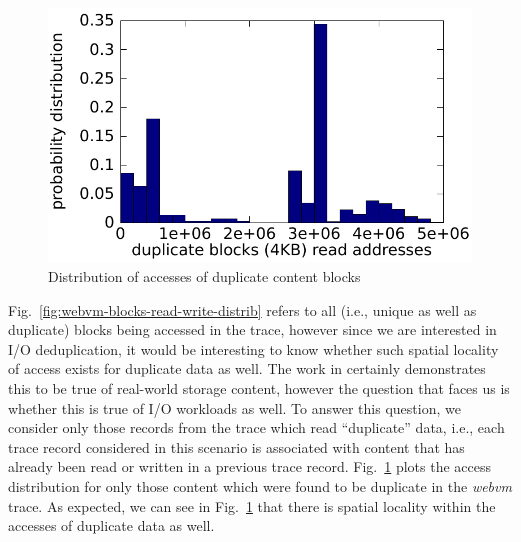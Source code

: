 \begin{figure}
    \centering
    \includegraphics[scale=0.6]{tracechar-figures/21-day/webvm-dedup-block-read-appended-21-prob.pdf}
    \caption{Distribution of accesses of duplicate content blocks}
    \label{fig:webvm-blocks-dedup-distrib}
\end{figure}

Fig.~\ref{fig:webvm-blocks-read-write-distrib} refers to all (i.e., unique as well as
duplicate) blocks
being accessed in the trace, however since we are interested in I/O
deduplication, it would be interesting to know whether such spatial
locality of access exists for duplicate data as well. The work in
\cite{idedup} certainly demonstrates this to be true of real-world storage content,
however the question that faces us is whether this is true of I/O workloads
as well.
To answer this question, we
consider only those records from the trace which read ``duplicate''
data, i.e., each trace record considered in this scenario is associated
with content that has already been read or written in a previous trace
record. 
Fig.~\ref{fig:webvm-blocks-dedup-distrib}
plots the access distribution for only those content which were
found to be duplicate in the \textit{webvm} trace.
As expected, we can see in Fig.~\ref{fig:webvm-blocks-dedup-distrib}
that there is spatial locality within the accesses
of duplicate data as well.

